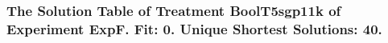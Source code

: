  \begin{frame}
 \fontsize{8pt}{9pt}\selectfont
 \frametitle{ The Solution Table of Treatment BoolT5sgp11k of Experiment ExpF. Fit: 0. Unique Shortest Solutions: 40. }

 \label{ExpFSolutionTable009.tex}  
 \end{frame}

